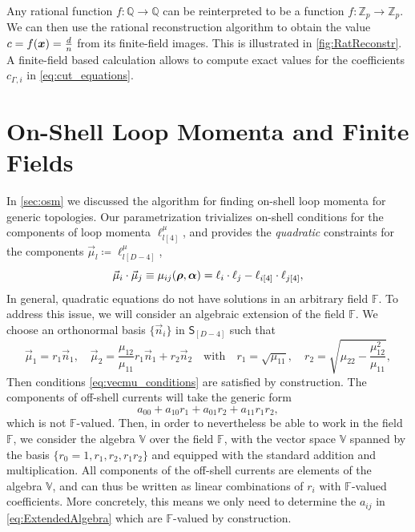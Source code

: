Any rational function $f: \mathbb{Q} \longrightarrow \mathbb{Q}$ can be reinterpreted
to be a function $f: \mathbb{Z}_p \longrightarrow \mathbb{Z}_p$.
We can then use the rational reconstruction algorithm to obtain the value $c = f(\vb*{x}) = \frac{d}{n}$
from its finite-field images. This is illustrated in \cref{fig:RatReconstr}.
A finite-field based calculation allows to compute exact values
for the coefficients $c_{\Gamma,i}$ in \eqref{eq:cut_equations}.


\section{On-Shell Loop Momenta and Finite Fields}
\label{sec:muij_square_roots}

In \cref{sec:osm} we discussed the algorithm for
finding on-shell loop momenta for generic topologies.
Our parametrization trivializes on-shell conditions for the components
of loop momenta $\ell^{\mu}_{l[4]}$, and provides
the \emph{quadratic} constraints for the components $\vec{\mu}_l \coloneqq \ell^{\mu}_{l[D-4]}  $,
\begin{equation} \label{eq:vecmu_conditions}
  \va{\mu}_i \cdot \va{\mu}_j  \equiv  \mu_{ij} (\vb*{\rho},\vb*{\alpha}) = \ell_i\cdot \ell_j - \ell_{i[4]}\cdot \ell_{j[4]},
\end{equation}
In general, quadratic equations do not have solutions in an arbitrary field $\mathbb{F}$.
To address this issue, we will consider an algebraic extension of the field $\mathbb{F}$.
We choose an orthonormal
basis $\{\vec{n}_i\}$ in $\mathsf{S}_{[D-4]}$ such that
\begin{equation}
\vec{\mu}_1 = r_1 \vec{n}_1, \quad  \vec{\mu}_2 = \frac{\mu_{12}}{\mu_{11}} r_1 \vec{n}_1 + r_2 \vec{n}_2
  \quad \mathrm{with} \quad r_1 = \sqrt{\mu_{11}}, \quad r_2 = 
  \sqrt{\mu_{22} - \frac{\mu_{12}^2}{\mu_{11}}},
\end{equation}
Then conditions \cref{eq:vecmu_conditions} are satisfied by construction.
The components of off-shell currents will take the generic form
\begin{equation}
  \label{eq:ExtendedAlgebra}
  a_{00} + a_{10} r_1 + a_{01} r_2 + a_{11} r_1 r_2, 
\end{equation}
which is not $\mathbb{F}$-valued.
Then, in order to nevertheless be able to
work in the field $\mathbb{F}$, we consider 
the algebra $\mathbb{V}$ over the field $\mathbb{F}$, with 
the vector space $\mathbb{V}$ spanned by the basis 
$\{r_0=1,r_1,r_2,r_1r_2\}$ and equipped with the standard
addition and multiplication.
All components of the off-shell currents are elements 
of the algebra $\mathbb{V}$, and can thus be written as linear combinations
of $r_i$ with $\mathbb{F}$-valued coefficients. More
concretely, this means we only need to determine the $a_{ij}$ 
in \cref{eq:ExtendedAlgebra} which are $\mathbb{F}$-valued
by construction.

